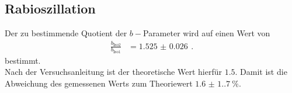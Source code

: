 \subsection{Rabioszillation}
Der zu bestimmende Quotient der $b-$Parameter wird auf einen Wert von
\begin{align*}
    \frac{b_\text{Iso2}}{b_\text{Iso1}} &= \SI{1.525(26)}{} \, .
\end{align*}
bestimmt.\\
Nach der Versuchsanleitung ist der theoretische Wert hierfür $1.5$. 
Damit ist die Abweichung des gemessenen Werts zum Theoriewert $\SI{1.6(1.7)}{}\%$.
